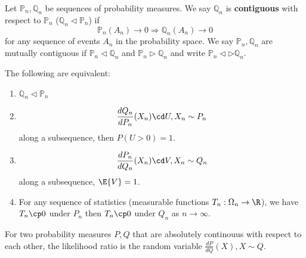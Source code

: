 \begin{defn}
  \label{defn:parametric_statistical_models:11}
  Let $\mathbb{P}_{n}, \mathbb{Q}_{n}$ be sequences of probability
  measures.  We say $\mathbb{Q}_{n}$ is \textbf{contiguous} with
  respect to $\mathbb{P}_{n}$ ($\mathbb{Q}_{n} \lhd \mathbb{P}_{n}$) if
  \begin{equation}
    \label{eq:90}
    \mathbb{P}_{n}(A_{n}) \rightarrow 0 \Rightarrow
    \mathbb{Q}_{n}(A_{n}) \rightarrow 0
  \end{equation} for any sequence of events $A_{n}$ in the probability
  space.  We say $\mathbb{P}_{n}, \mathbb{Q}_{n}$ are mutually
  contiguous if $\mathbb{P}_{n} \lhd \mathbb{Q}_{n}$ and
  $\mathbb{P}_{n} \rhd \mathbb{Q}_{n}$ and write $\mathbb{P}_{n} \lhd
  \rhd \mathbb{Q}_{n}$.
\end{defn}

\begin{lem}
  The following are equivalent:
  \begin{enumerate}
  \item $\mathbb{Q}_{n} \lhd \mathbb{P}_{n}$
  \item
    \begin{equation}
      \label{eq:91}
      \frac{dQ_{n}}{dP_{n}}(X_{n}) \cd U, X_{n} \sim P_{n}
    \end{equation} along a subsequence, then $P(U > 0) = 1$.
  \item
    \begin{equation}
      \label{eq:92}
      \frac{dP_{n}}{dQ_{n}}(X_{n}) \cd V, X_{n} \sim Q_{n}
    \end{equation} along a subsequence, $\E{V} = 1$.
  \item For any sequence of statistics (measurable functions $T_{n} :
    \Omega_{n} \rightarrow \R$), we have $T_{n} \cp 0$ under $P_{n}$
    then $T_{n} \cp 0$ under $Q_{n}$ as $n \rightarrow \infty$.
  \end{enumerate}
\end{lem}

\begin{remark}
  For two probability measures $P, Q$ that are absolutely continouus with
  respect to each other, the likelihood ratio is the random variable
  $\frac{dP}{dQ}(X), X \sim Q$.
\end{remark}

